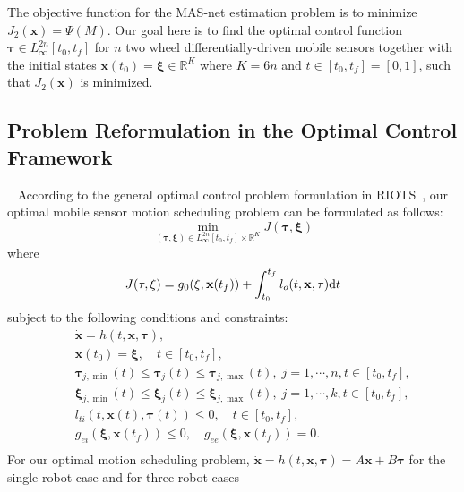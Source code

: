     The objective function for the MAS-net estimation problem is to minimize $J_2(\mathbf{x}) =\Psi(M).$ Our goal here is to find the optimal control function $\mathbf{\tau}\in L_{\infty}^{2n}[t_0,t_f]$ for $n$ two wheel differentially-driven mobile sensors together with  the initial states $\mathbf{x}(t_0) = \mathbf{\xi} \in \mathbb{R}^K$ where $K=6n$ and $t\in [t_0, t_f]=[0,1]$, such that $J_2(\mathbf{x})$ is minimized.

\subsection{Problem Reformulation in the Optimal Control Framework}~\label{s:optc}
According to the general   optimal control problem formulation in RIOTS~\cite{chenriots95}, our optimal mobile sensor motion scheduling problem can be formulated as follows:
\begin{equation}\label{e:ocp}
   \min_{(\mathbf{\tau}, \mathbf{\xi}) \in L_{\infty}^{2n}[t_0,t_f]\times \mathbb{R}^K}
   J(\mathbf{\tau}, \mathbf{\xi})
\end{equation}
 where
 $$        J(\mathbf{\tau}, \mathbf{\xi})=g_0(\xi, \mathbf{x}(t_f))
 +  \int_{t_0}^{t_f} l_o(t, \mathbf{x}, \mathbf{\tau}) \hbox{d}t $$
subject to the following conditions and constraints:
\begin{eqnarray*}
 && \mathbf{\dot x} = h(t,\mathbf{x},\mathbf{\tau}), \\
 &&  \mathbf{x}(t_0) = \mathbf{\xi}, \quad t\in [t_0, t_f], \\
 &&  \mathbf{\tau}_{j,\min}(t) \leq \mathbf{\tau}_{j}(t) \leq  \mathbf{\tau}_{j,\max}(t), \; j=1,\cdots,n, t\in [t_0, t_f], \\
%
 &&   \mathbf{\xi}_{j,\min}(t) \leq \mathbf{\xi}_{j}(t) \leq  \mathbf{\xi}_{j,\max}(t), \; j=1,\cdots,k, t\in [t_0, t_f],\\
%
 &&  l_{ti}(t,\mathbf{x}(t), \mathbf{\tau}(t) ) \leq 0, \quad t\in [t_0, t_f], \\
 &&  g_{ei}(\mathbf{\xi}, \mathbf{x}(t_f)) \leq 0, \quad
    g_{ee}(\mathbf{\xi}, \mathbf{x}(t_f)) = 0. \\
 \end{eqnarray*}
 For our optimal motion scheduling problem,
 $ \mathbf{\dot x}=h(t,\mathbf{x},\mathbf{\tau})=A \mathbf{x} + B \mathbf{\tau}$
for the single robot case  and for three robot cases

